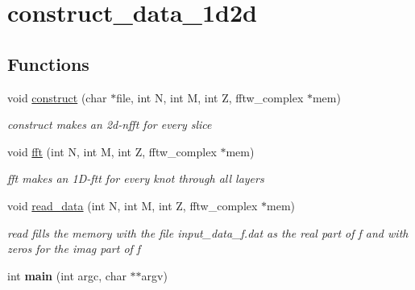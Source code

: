 \hypertarget{group__applications__mri3d__construct__data__1d2d}{
\section{construct\_\-data\_\-1d2d}
\label{group__applications__mri3d__construct__data__1d2d}
}
\subsection*{Functions}
\begin{CompactItemize}
\item 
\hypertarget{group__applications__mri3d__construct__data__1d2d_ga0}{
void \hyperlink{group__applications__mri3d__construct__data__1d2d_ga0}{construct} (char $\ast$file, int N, int M, int Z, fftw\_\-complex $\ast$mem)}
\label{group__applications__mri3d__construct__data__1d2d_ga0}

\begin{CompactList}\small\item\em construct makes an 2d-nfft for every slice \item\end{CompactList}\item 
\hypertarget{group__applications__mri3d__construct__data__1d2d_ga1}{
void \hyperlink{group__applications__mri3d__construct__data__1d2d_ga1}{fft} (int N, int M, int Z, fftw\_\-complex $\ast$mem)}
\label{group__applications__mri3d__construct__data__1d2d_ga1}

\begin{CompactList}\small\item\em fft makes an 1D-ftt for every knot through all layers \item\end{CompactList}\item 
\hypertarget{group__applications__mri3d__construct__data__1d2d_ga2}{
void \hyperlink{group__applications__mri3d__construct__data__1d2d_ga2}{read\_\-data} (int N, int M, int Z, fftw\_\-complex $\ast$mem)}
\label{group__applications__mri3d__construct__data__1d2d_ga2}

\begin{CompactList}\small\item\em read fills the memory with the file input\_\-data\_\-f.dat as the real part of f and with zeros for the imag part of f \item\end{CompactList}\item 
\hypertarget{group__applications__mri3d__construct__data__1d2d_ga3}{
int {\bf main} (int argc, char $\ast$$\ast$argv)}
\label{group__applications__mri3d__construct__data__1d2d_ga3}

\end{CompactItemize}
